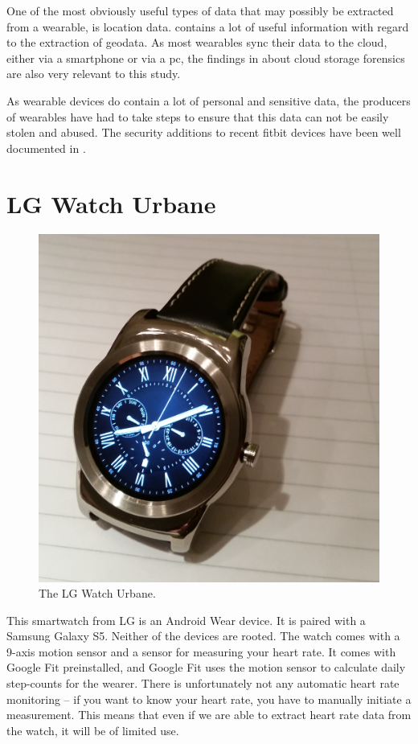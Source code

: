 \documentclass[a4paper,11pt,dvips]{article}
\begin{document}
One of the most obviously useful types of data that may possibly be extracted from a wearable, is location data. \cite{maus2011forensic} contains a lot of useful information with regard to the extraction of geodata. As most wearables sync their data to the cloud, either via a smartphone or via a pc, the findings in \cite{chung2012digital} about cloud storage forensics are also very relevant to this study.

As wearable devices do contain a lot of personal and sensitive data, the producers of wearables have had to take steps to ensure that this data can not be easily stolen and abused. The security additions to recent fitbit devices have been well documented in \cite{cyr2014security}.


\section{LG Watch Urbane}

\begin{figure}
\begin{center}
\includegraphics[natwidth=1000bp,natheight=1019bp,width=0.8\linewidth]{urbane}
\end{center}
\caption{The LG Watch Urbane.}
\label{fig:urbane}
\end{figure}

This smartwatch from LG is an Android Wear device. It is paired with a Samsung Galaxy S5. Neither of the devices are rooted. The watch comes with a 9-axis motion sensor and a sensor for measuring your heart rate. It comes with Google Fit preinstalled, and Google Fit uses the motion sensor to calculate daily step-counts for the wearer. There is unfortunately not any automatic heart rate monitoring -- if you want to know your heart rate, you have to manually initiate a measurement. This means that even if we are able to extract heart rate data from the watch, it will be of limited use.
\end{document}
